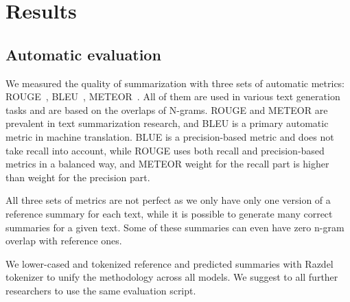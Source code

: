 \documentclass[runningheads]{llncs}
\begin{document}
\section{Results}
\subsection{Automatic evaluation}
We measured the quality of summarization with three sets of automatic metrics: ROUGE~\cite{rouge}, BLEU~\cite{bleu}, METEOR~\cite{meteor}. All of them are used in various text generation tasks and are based on the overlaps of N-grams. ROUGE and METEOR are prevalent in text summarization research, and BLEU is a primary automatic metric in machine translation. BLUE is a precision-based metric and does not take recall into account, while ROUGE uses both recall and precision-based metrics in a balanced way, and METEOR weight for the recall part is higher than weight for the precision part.

All three sets of metrics are not perfect as we only have only one version of a reference summary for each text, while it is possible to generate many correct summaries for a given text. Some of these summaries can even have zero n-gram overlap with reference ones.

We lower-cased and tokenized reference and predicted summaries with Razdel tokenizer to unify the methodology across all models. We suggest to all further researchers to use the same evaluation script.
\end{document}
